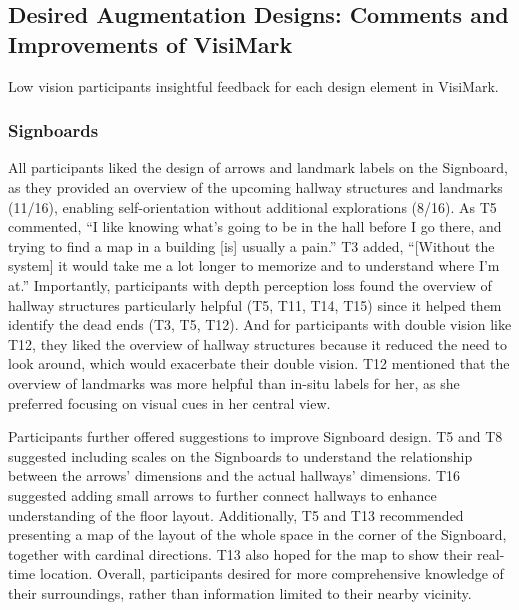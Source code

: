 \subsection{Desired Augmentation Designs: Comments and Improvements of VisiMark}
Low vision participants  insightful feedback for each design element in VisiMark. 


\subsubsection{Signboards}
\label{Signboards}
All participants liked the design of arrows and landmark labels on the Signboard, as they provided an overview of the upcoming hallway structures and landmarks (11/16), enabling self-orientation without additional explorations (8/16). As T5 commented, ``I like knowing what's going to be in the hall before I go there, and trying to find a map in a building [is] usually a pain.'' T3 added, ``[Without the system] it would take me a lot longer to memorize and to understand where I'm at.'' Importantly, participants with depth perception loss found the overview of hallway structures particularly helpful (T5, T11, T14, T15) since it helped them identify the dead ends (T3, T5, T12). And for participants with double vision like T12, they liked the overview of hallway structures because it reduced the need to look around, which would exacerbate their double vision. T12 mentioned that the overview of landmarks was more helpful than in-situ labels for her, as she preferred focusing on visual cues in her central view. %


Participants further offered suggestions to improve Signboard design. T5 and T8 suggested including scales on the Signboards to understand the relationship between the arrows' dimensions and the actual hallways' dimensions. T16 suggested adding small arrows to further connect hallways to enhance understanding of the floor layout. Additionally, T5 and T13 recommended presenting a map of the layout of the whole space in the corner of the Signboard, together with cardinal directions. T13 also hoped for the map to show their real-time location. Overall, participants desired for more comprehensive knowledge of their surroundings, rather than information limited to their nearby vicinity.


